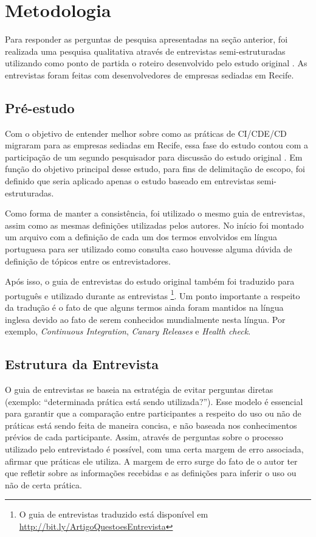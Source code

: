 
\section{Metodologia}

Para responder as perguntas de pesquisa apresentadas na seção anterior, foi realizada uma pesquisa qualitativa através de entrevistas semi-estruturadas utilizando como ponto de partida o roteiro desenvolvido pelo estudo original \cite{empiricalStudy2016}. As entrevistas foram feitas com desenvolvedores de empresas sediadas em Recife.


\subsection{Pré-estudo}

Com o objetivo de entender melhor sobre como as práticas de CI/CDE/CD migraram para as empresas sediadas em Recife, essa fase do estudo contou com a participação de um segundo pesquisador para discussão do estudo original \cite{empiricalStudy2016}. Em função do objetivo principal desse estudo, para fins de delimitação de escopo, foi definido que seria aplicado apenas o estudo baseado em entrevistas semi-estruturadas. 

Como forma de manter a consistência, foi utilizado o mesmo guia de entrevistas, assim como as mesmas definições utilizadas pelos autores. No início foi montado um arquivo com a definição de cada um dos termos envolvidos em língua portuguesa para ser utilizado como consulta caso houvesse alguma dúvida de definição de tópicos entre os entrevistadores.

Após isso, o guia de entrevistas do estudo original também foi traduzido para português e utilizado durante as entrevistas \footnote{O guia de entrevistas traduzido está disponível em \url{http://bit.ly/ArtigoQuestoesEntrevista}}. Um ponto importante a respeito da tradução é o fato de que alguns termos ainda foram mantidos na língua inglesa devido ao fato de serem conhecidos mundialmente nesta língua. Por exemplo, \emph{Continuous Integration}, \emph{Canary Releases} e \emph{Health check}.


\subsection{Estrutura da Entrevista}

O guia de entrevistas se baseia na estratégia de evitar perguntas diretas (exemplo: “determinada prática está sendo utilizada?”). Esse modelo é essencial para garantir que a comparação entre participantes a respeito do uso ou não de práticas está sendo feita de maneira concisa, e não baseada nos conhecimentos prévios de cada participante. Assim, através de perguntas sobre o processo utilizado pelo entrevistado é possível, com uma certa margem de erro associada, afirmar que práticas ele utiliza. A margem de erro surge do fato de o autor ter que refletir sobre as informações recebidas e as definições para inferir o uso ou não de certa prática.

